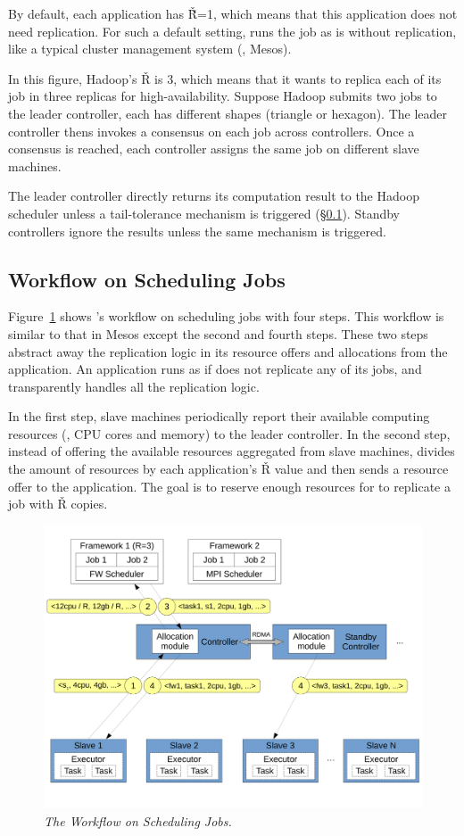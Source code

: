 By default, each application has \v{\v{R}=1}, which means that this application 
does not need replication. For such a default setting, \xxx runs the job as is 
without replication, like a typical cluster management system (\eg, Mesos).

In this figure, Hadoop's \v{R} is 3, which means that it wants to replica each 
of its job in three replicas for high-availability. Suppose Hadoop submits two 
jobs to the leader controller, each has different shapes (triangle or 
hexagon). The leader controller thens invokes a consensus on each job across 
controllers. Once a consensus is reached, each controller assigns the same job 
on different slave machines.

The leader controller directly returns its computation result to the Hadoop 
scheduler unless a tail-tolerance mechanism is triggered (\S\ref{sec:workflow}). 
Standby controllers ignore the results unless the same mechanism is triggered.



\subsection{Workflow on Scheduling Jobs} \label{sec:workflow}

Figure~\ref{fig:workflow} shows \xxx's workflow on scheduling jobs with four 
steps. This workflow is similar to that in Mesos except the second and fourth 
steps. These two steps \xxx abstract away the replication logic in its resource 
offers and allocations from the application. An application runs as if \xxx does 
not replicate any of its jobs, and \xxx transparently handles all the 
replication logic.

In the first step, slave machines periodically report their available computing 
resources (\eg, CPU cores and memory) to the leader controller. In the second 
step, instead of offering the available resources aggregated from slave 
machines, \xxx divides the amount of resources by each application's \v{R} 
value and then sends a resource offer to the application. The goal is to 
reserve enough resources for \xxx to replicate a job with \v{R} copies.

\begin{figure}[t]
\centering
\includegraphics[width=.47\textwidth]{figures/flow}
\vspace{-.2in}
\caption{{\em The \xxx Workflow on Scheduling Jobs.}} \label{fig:workflow}
\vspace{.05in}
\end{figure}

